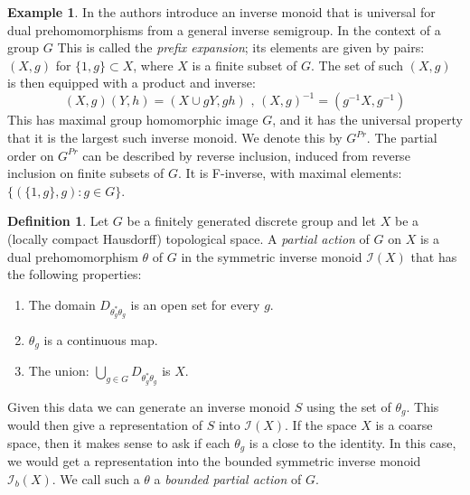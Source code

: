 \documentclass[11pt]{amsart}
\theoremstyle{plain}
\theoremstyle{definition}%
\newtheorem{definition}[theorem]{Definition}%
\newtheorem{example}[theorem]{Example}%
\theoremstyle{remark}%
\begin{document}
\begin{example}
In \cite{MR745358,MR2221438} the authors introduce an inverse monoid that is universal for dual prehomomorphisms from a general inverse semigroup. In the context of a group $G$ This is called the \textit{prefix expansion}; its elements are given by pairs: $(X,g)$ for $\lbrace 1,g\rbrace \subset X$, where $X$ is a finite subset of $G$. The set of such $(X,g)$ is then equipped with a product and inverse:
\begin{equation*}
(X,g)(Y,h) = (X\cup gY,gh)\mbox{ , } (X,g)^{-1}=(g^{-1}X,g^{-1})
\end{equation*}
This has maximal group homomorphic image $G$, and it has the universal property that it is the largest such inverse monoid. We denote this by $G^{Pr}$. The partial order on $G^{Pr}$ can be described by reverse inclusion, induced from reverse inclusion on finite subsets of $G$. It is F-inverse, with maximal elements: $\lbrace(\lbrace 1,g \rbrace, g):g \in G \rbrace$.
\end{example}

\begin{definition}
Let $G$ be a finitely generated discrete group and let $X$ be a (locally compact Hausdorff) topological space. A \textit{partial action} of $G$ on $X$ is a dual prehomomorphism $\theta$ of $G$ in the symmetric inverse monoid $\mathcal{I}(X)$ that has the following properties:
\begin{enumerate}
\item The domain $D_{\theta_{g}^{*}\theta_{g}}$ is an open set for every $g$.
\item $\theta_{g}$ is a continuous map.
\item The union: $\bigcup_{g \in G}D_{\theta_{g}^{*}\theta_{g}}$ is $X$.
\end{enumerate}
\end{definition}

Given this data we can generate an inverse monoid $S$ using the set of $\theta_{g}$. This would then give a representation of $S$ into $\mathcal{I}(X)$. If the space $X$ is a coarse space, then it makes sense to ask if each $\theta_{g}$ is a close to the identity. In this case, we would get a representation into the bounded symmetric inverse monoid $\mathcal{I}_{b}(X)$. We call such a $\theta$ a \textit{bounded partial action} of $G$.
\end{document}
